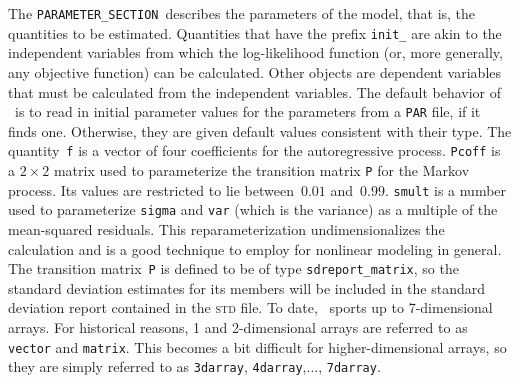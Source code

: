 \documentclass{admbmanual}
\newcommand\PS{\texttt{PARAMETER\_SECTION}}
\begin{document}
The \PS\ describes the parameters of the model, that is, the quantities to be
estimated. Quantities that have the prefix \texttt{init\_} are akin to the
independent variables from which the log-likelihood function (or, more
generally, any objective function) can be calculated. Other objects are
dependent variables that must be calculated from the independent variables. The
default behavior of \ADM\ is to read in initial parameter values for the
parameters from a \texttt{PAR} file, if it finds one. Otherwise, they are given
default values consistent with their type. The quantity~\texttt{f} is a vector
of four coefficients for the autoregressive process. \texttt{Pcoff} is a
$2\times 2$ matrix used to parameterize the transition matrix \texttt{P} for the
Markov process. Its values are restricted to lie between~$0.01$ and~$0.99$.
\texttt{smult} is a number used to parameterize \texttt{sigma} and \texttt{var}
(which is the variance) as a multiple of the mean-squared residuals. This
reparameterization undimensionalizes the calculation and is a good technique to
employ for nonlinear modeling in general. The transition matrix~\texttt{P} is
defined to be of type \texttt{sdreport\_matrix}, so the standard deviation
estimates for its members will be included in the standard deviation report
contained in the \textsc{std} file. To date, \ADM\ sports up to 7-dimensional
arrays. For historical reasons, 1 and 2-dimensional arrays are referred to as
\texttt{vector} and \texttt{matrix}. This becomes a bit difficult for
higher-dimensional arrays, so they are simply referred to as \texttt{3darray},
\texttt{4darray},$\ldots$, \texttt{7darray}.
\end{document}
